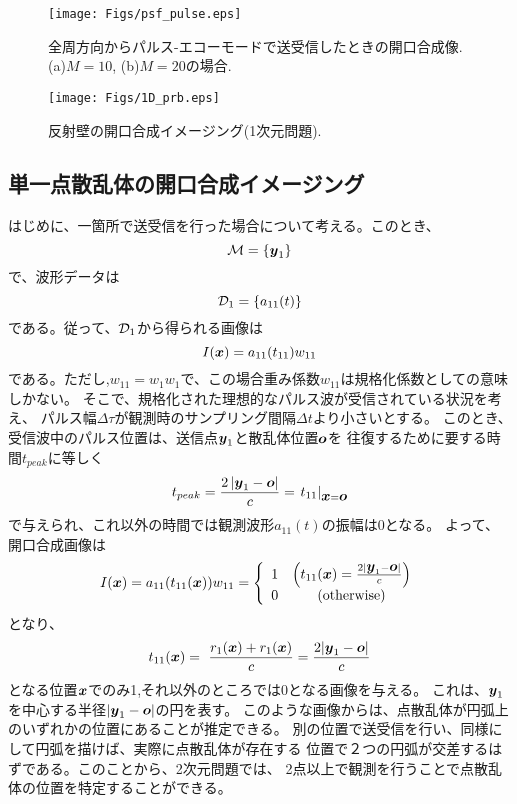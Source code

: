 \documentclass[10pt,a4j,dvipdfmx]{jarticle}
\begin{document}
\begin{figure}[h]
	\begin{center}
	\texttt{[image: Figs/psf\_pulse.eps]} 
	\end{center}
	\caption{全周方向からパルス-エコーモードで送受信したときの開口合成像.(a)$M=10$, (b)$M=20$の場合.} 
	\label{fig:psf_pulse}
\end{figure}
\begin{figure}[h]
	\begin{center}
	\texttt{[image: Figs/1D\_prb.eps]} 
	\end{center}
	\caption{反射壁の開口合成イメージング(1次元問題).} 
	\label{fig:1D_prb}
\end{figure}
\subsection{単一点散乱体の開口合成イメージング}
はじめに、一箇所で送受信を行った場合について考える。このとき、
\begin{equation}
	{\cal M} =\left\{ 
		\mbox{\boldmath $y$}_1
	\right\}
	\label{eqn:M1}
\end{equation}
で、波形データは
\begin{equation}
	{\cal D}_1=\left\{ a_{11}(t)\right\}
	\label{eqn:}
\end{equation}
である。従って、${\cal D}_1$から得られる画像は
\begin{equation}
	I(\mbox{\boldmath $x$})=a_{11}(t_{11})w_{11}
	\label{eqn:}
\end{equation}
である。ただし,$w_{11}=w_1w_1$で、この場合重み係数$w_{11}$は規格化係数としての意味しかない。
そこで、規格化された理想的なパルス波が受信されている状況を考え、
パルス幅$\Delta \tau$が観測時のサンプリング間隔$\Delta t$より小さいとする。
このとき、受信波中のパルス位置は、送信点$\mbox{\boldmath $y$}_1$と散乱体位置$\mbox{\boldmath $o$}$を
往復するために要する時間$t_{peak}$に等しく
\begin{equation}
	t_{peak}
	=
	\frac{2\left| \mbox{\boldmath $y$}_1 -\mbox{\boldmath $o$}\right|}{c}
	=
	\left. t_{11} \right|_{\mbox{\boldmath $x$}=\mbox{\boldmath $o$}}
	\label{eqn:t_peak}
\end{equation}
で与えられ、これ以外の時間では観測波形$a_{11}(t)$の振幅は0となる。
よって、開口合成画像は
\begin{equation}
	I(\mbox{\boldmath $x$})=a_{11}(t_{11}(\mbox{\boldmath $x$}))w_{11}=\left\{
	\begin{array}{cc}
		1 &  \left(t_{11}(\mbox{\boldmath $x$})=\frac{2|\mbox{\boldmath $y$}_1-\mbox{\boldmath $o$}|}{c}\right)\\
		0 &  ({\rm otherwise})
	\end{array}
	\right.
	\label{eqn:}
\end{equation}
となり、
\begin{equation}
	t_{11}(\mbox{\boldmath $x$})=\
	\frac{r_1(\mbox{\boldmath $x$})+r_1(\mbox{\boldmath $x$})}{c}
	=
	\frac{2|\mbox{\boldmath $y$}_1-\mbox{\boldmath $o$}|}{c}
	\label{eqn:}
\end{equation}
となる位置$\mbox{\boldmath $x$}$でのみ1,それ以外のところでは0となる画像を与える。
これは、$\mbox{\boldmath $y$}_1$を中心する半径$|\mbox{\boldmath $y$}_1-\mbox{\boldmath $o$}|$の円を表す。
このような画像からは、点散乱体が円弧上のいずれかの位置にあることが推定できる。
別の位置で送受信を行い、同様にして円弧を描けば、実際に点散乱体が存在する
位置で２つの円弧が交差するはずである。このことから、2次元問題では、
2点以上で観測を行うことで点散乱体の位置を特定することができる。
\end{document}
